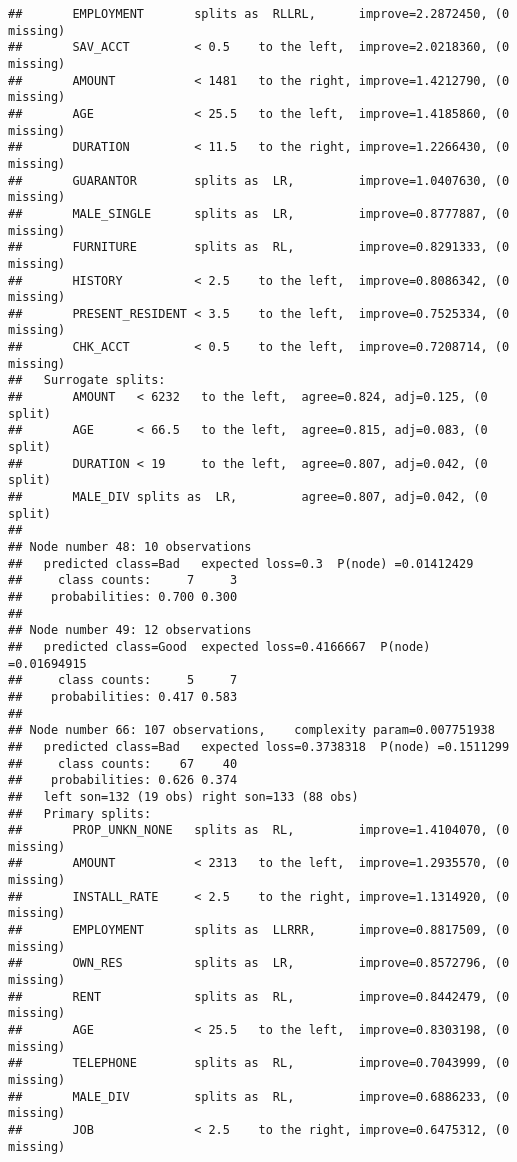 \documentclass[
]{article}
\begin{document}
\begin{verbatim}
##       EMPLOYMENT       splits as  RLLRL,      improve=2.2872450, (0 missing)
##       SAV_ACCT         < 0.5    to the left,  improve=2.0218360, (0 missing)
##       AMOUNT           < 1481   to the right, improve=1.4212790, (0 missing)
##       AGE              < 25.5   to the left,  improve=1.4185860, (0 missing)
##       DURATION         < 11.5   to the right, improve=1.2266430, (0 missing)
##       GUARANTOR        splits as  LR,         improve=1.0407630, (0 missing)
##       MALE_SINGLE      splits as  LR,         improve=0.8777887, (0 missing)
##       FURNITURE        splits as  RL,         improve=0.8291333, (0 missing)
##       HISTORY          < 2.5    to the left,  improve=0.8086342, (0 missing)
##       PRESENT_RESIDENT < 3.5    to the left,  improve=0.7525334, (0 missing)
##       CHK_ACCT         < 0.5    to the left,  improve=0.7208714, (0 missing)
##   Surrogate splits:
##       AMOUNT   < 6232   to the left,  agree=0.824, adj=0.125, (0 split)
##       AGE      < 66.5   to the left,  agree=0.815, adj=0.083, (0 split)
##       DURATION < 19     to the left,  agree=0.807, adj=0.042, (0 split)
##       MALE_DIV splits as  LR,         agree=0.807, adj=0.042, (0 split)
## 
## Node number 48: 10 observations
##   predicted class=Bad   expected loss=0.3  P(node) =0.01412429
##     class counts:     7     3
##    probabilities: 0.700 0.300 
## 
## Node number 49: 12 observations
##   predicted class=Good  expected loss=0.4166667  P(node) =0.01694915
##     class counts:     5     7
##    probabilities: 0.417 0.583 
## 
## Node number 66: 107 observations,    complexity param=0.007751938
##   predicted class=Bad   expected loss=0.3738318  P(node) =0.1511299
##     class counts:    67    40
##    probabilities: 0.626 0.374 
##   left son=132 (19 obs) right son=133 (88 obs)
##   Primary splits:
##       PROP_UNKN_NONE   splits as  RL,         improve=1.4104070, (0 missing)
##       AMOUNT           < 2313   to the left,  improve=1.2935570, (0 missing)
##       INSTALL_RATE     < 2.5    to the right, improve=1.1314920, (0 missing)
##       EMPLOYMENT       splits as  LLRRR,      improve=0.8817509, (0 missing)
##       OWN_RES          splits as  LR,         improve=0.8572796, (0 missing)
##       RENT             splits as  RL,         improve=0.8442479, (0 missing)
##       AGE              < 25.5   to the left,  improve=0.8303198, (0 missing)
##       TELEPHONE        splits as  RL,         improve=0.7043999, (0 missing)
##       MALE_DIV         splits as  RL,         improve=0.6886233, (0 missing)
##       JOB              < 2.5    to the right, improve=0.6475312, (0 missing)

\end{verbatim}
\end{document}
